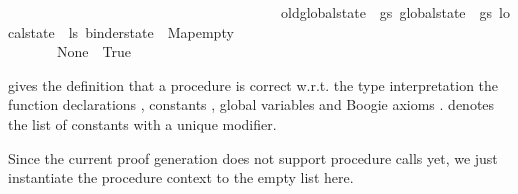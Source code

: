 \begin{isabellebody}
\ \ \ \ \ \ \ \ \ \ \ \ \ \ \ \ \ \ \ \ \ \ \ \ \ \ \ \ \ \ \ \ \ \ \ \ \ \ \ {\isasymlparr}old{\isacharunderscore}{\kern0pt}global{\isacharunderscore}{\kern0pt}state\ {\isacharequal}{\kern0pt}\ gs{\isacharcomma}{\kern0pt}\ global{\isacharunderscore}{\kern0pt}state\ {\isacharequal}{\kern0pt}\ gs{\isacharcomma}{\kern0pt}\ local{\isacharunderscore}{\kern0pt}state\ {\isacharequal}{\kern0pt}\ ls{\isacharcomma}{\kern0pt}\ binder{\isacharunderscore}{\kern0pt}state\ {\isacharequal}{\kern0pt}\ Map{\isachardot}{\kern0pt}empty{\isasymrparr}\ {\isacharparenright}{\kern0pt}\ {\isacharparenright}{\kern0pt}\isanewline
\ \ \ \ \ \ \ \ \ \ \ \ {\isacharparenright}{\kern0pt}\isanewline
\ \ \ \ \ \ \ \ \ \ {\isacharparenright}{\kern0pt}{\isacharparenright}{\kern0pt}{\isacharparenright}{\kern0pt}\isanewline
\ \ \ \ \ \ {\isacharbar}{\kern0pt}\ None\ {\isasymRightarrow}\ True{\isacharparenright}{\kern0pt}{\isachardoublequoteclose}%
\begin{isamarkuptext}%
 gives the definition
that a procedure  is correct w.r.t. the type interpretation  the function declarations , 
constants , global variables  and Boogie axioms . 
 denotes the list of constants with a unique modifier.

Since the current proof generation does not support procedure calls yet, we just instantiate the
procedure context to the empty list here. 


\end{isamarkuptext}
\end{isabellebody}
